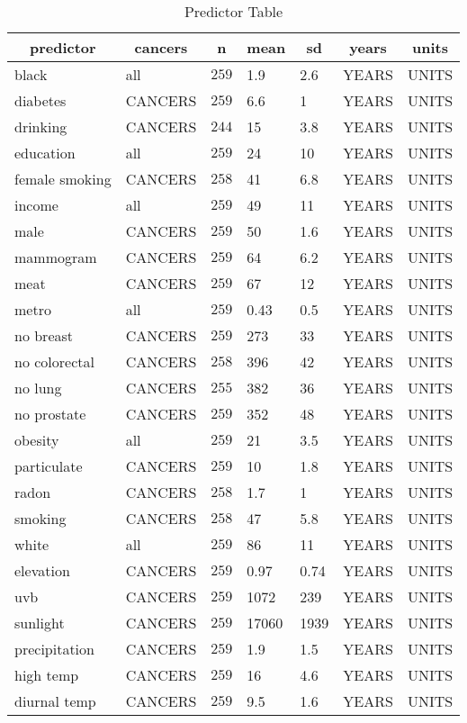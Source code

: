 %
\begin{table}[!tbp]
\caption{Predictor Table\label{tab:predictors}} 
\begin{center}
\begin{tabular}{llrllll}
\hline\hline
\multicolumn{1}{c}{predictor}&\multicolumn{1}{c}{cancers}&\multicolumn{1}{c}{n}&\multicolumn{1}{c}{mean}&\multicolumn{1}{c}{sd}&\multicolumn{1}{c}{years}&\multicolumn{1}{c}{units}\tabularnewline
\hline
black&all&$259$&1.9&2.6&YEARS&UNITS\tabularnewline
diabetes&CANCERS&$259$&6.6&1&YEARS&UNITS\tabularnewline
drinking&CANCERS&$244$&15&3.8&YEARS&UNITS\tabularnewline
education&all&$259$&24&10&YEARS&UNITS\tabularnewline
female smoking&CANCERS&$258$&41&6.8&YEARS&UNITS\tabularnewline
income&all&$259$&49&11&YEARS&UNITS\tabularnewline
male&CANCERS&$259$&50&1.6&YEARS&UNITS\tabularnewline
mammogram&CANCERS&$259$&64&6.2&YEARS&UNITS\tabularnewline
meat&CANCERS&$259$&67&12&YEARS&UNITS\tabularnewline
metro&all&$259$&0.43&0.5&YEARS&UNITS\tabularnewline
no breast&CANCERS&$259$&273&33&YEARS&UNITS\tabularnewline
no colorectal&CANCERS&$258$&396&42&YEARS&UNITS\tabularnewline
no lung&CANCERS&$255$&382&36&YEARS&UNITS\tabularnewline
no prostate&CANCERS&$259$&352&48&YEARS&UNITS\tabularnewline
obesity&all&$259$&21&3.5&YEARS&UNITS\tabularnewline
particulate&CANCERS&$259$&10&1.8&YEARS&UNITS\tabularnewline
radon&CANCERS&$258$&1.7&1&YEARS&UNITS\tabularnewline
smoking&CANCERS&$258$&47&5.8&YEARS&UNITS\tabularnewline
white&all&$259$&86&11&YEARS&UNITS\tabularnewline
elevation&CANCERS&$259$&0.97&0.74&YEARS&UNITS\tabularnewline
uvb&CANCERS&$259$&1072&239&YEARS&UNITS\tabularnewline
sunlight&CANCERS&$259$&17060&1939&YEARS&UNITS\tabularnewline
precipitation&CANCERS&$259$&1.9&1.5&YEARS&UNITS\tabularnewline
high temp&CANCERS&$259$&16&4.6&YEARS&UNITS\tabularnewline
diurnal temp&CANCERS&$259$&9.5&1.6&YEARS&UNITS\tabularnewline
\hline
\end{tabular}
\end{center}
\end{table}

